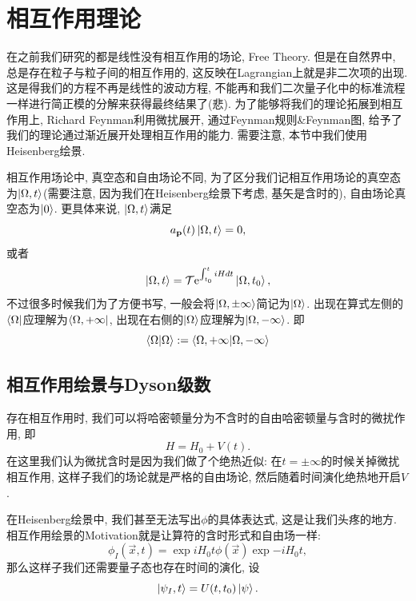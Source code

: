\section{相互作用理论}

在之前我们研究的都是线性没有相互作用的场论, Free Theory. 但是在自然界中, 总是存在粒子与粒子间的相互作用的, 这反映在Lagrangian上就是非二次项的出现. 这是得我们的方程不再是线性的波动方程, 不能再和我们二次量子化中的标准流程一样进行简正模的分解来获得最终结果了(悲). 为了能够将我们的理论拓展到相互作用上, Richard Feynman利用微扰展开, 通过Feynman规则\&Feynman图, 给予了我们的理论通过渐近展开处理相互作用的能力. 需要注意, 本节中我们使用Heisenberg绘景.

相互作用场论中, 真空态和自由场论不同, 为了区分我们记相互作用场论的真空态为$\ket{\Omega, t}$(需要注意, 因为我们在Heisenberg绘景下考虑, 基矢是含时的), 自由场论真空态为$\ket0$. 更具体来说, $\ket{\Omega, t}$满足
\begin{equation}
    a_{\mathbf{p}}(t)\ket{\Omega, t}=0,
\end{equation}
或者
\begin{equation}
    \ket{\Omega, t}=\mathcal T\mathrm e^{\int_{t_0}^{t} iHdt}\ket{\Omega, t_0},
\end{equation}
不过很多时候我们为了方便书写, 一般会将$\ket{\Omega, \pm\infty}$简记为$\ket\Omega$. 出现在算式左侧的$\bra\Omega$应理解为$\bra{\Omega, +\infty}$, 出现在右侧的$\ket\Omega$应理解为$\ket{\Omega, -\infty}$. 即
\begin{equation}
    \braket{\Omega|\Omega}:=\braket{\Omega, +\infty|\Omega, -\infty}\label{vaccum-contraction}
\end{equation}

\subsection{相互作用绘景与Dyson级数}
存在相互作用时, 我们可以将哈密顿量分为不含时的自由哈密顿量与含时的微扰作用, 即
\begin{equation}
    H=H_0+V(t).
\end{equation}
在这里我们认为微扰含时是因为我们做了个绝热近似: 在$t=\pm\infty$的时候关掉微扰相互作用, 这样子我们的场论就是严格的自由场论, 然后随着时间演化绝热地开启$V$.

在Heisenberg绘景中, 我们甚至无法写出$\phi$的具体表达式, 这是让我们头疼的地方. 相互作用绘景的Motivation就是让算符的含时形式和自由场一样:
\begin{equation}
    \phi_I(\vec x, t)=\exp{iH_0t}\phi(\vec x)\exp{-iH_0t},
\end{equation}
那么这样子我们还需要量子态也存在时间的演化, 设
\begin{equation}
    \ket{\psi_I, t}=U(t, t_0)\ket\psi.
\end{equation}

